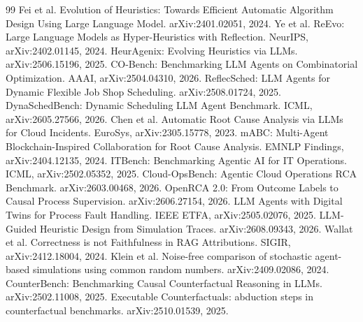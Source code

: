 \documentclass[UTF8,12pt,a4paper]{ctexart}
\begin{document}
\begin{thebibliography}{99}\small
{} Fei et al. Evolution of Heuristics: Towards Efficient Automatic Algorithm Design Using Large Language Model. arXiv:2401.02051, 2024.
 Ye et al. ReEvo: Large Language Models as Hyper-Heuristics with Reflection. NeurIPS, arXiv:2402.01145, 2024.
 HeurAgenix: Evolving Heuristics via LLMs. arXiv:2506.15196, 2025.
 CO-Bench: Benchmarking LLM Agents on Combinatorial Optimization. AAAI, arXiv:2504.04310, 2026.
 ReflecSched: LLM Agents for Dynamic Flexible Job Shop Scheduling. arXiv:2508.01724, 2025.
 DynaSchedBench: Dynamic Scheduling LLM Agent Benchmark. ICML, arXiv:2605.27566, 2026.
 Chen et al. Automatic Root Cause Analysis via LLMs for Cloud Incidents. EuroSys, arXiv:2305.15778, 2023.
 mABC: Multi-Agent Blockchain-Inspired Collaboration for Root Cause Analysis. EMNLP Findings, arXiv:2404.12135, 2024.
 ITBench: Benchmarking Agentic AI for IT Operations. ICML, arXiv:2502.05352, 2025.
 Cloud-OpsBench: Agentic Cloud Operations RCA Benchmark. arXiv:2603.00468, 2026.
 OpenRCA 2.0: From Outcome Labels to Causal Process Supervision. arXiv:2606.27154, 2026.
 LLM Agents with Digital Twins for Process Fault Handling. IEEE ETFA, arXiv:2505.02076, 2025.
 LLM-Guided Heuristic Design from Simulation Traces. arXiv:2608.09343, 2026.
 Wallat et al. Correctness is not Faithfulness in RAG Attributions. SIGIR, arXiv:2412.18004, 2024.
 Klein et al. Noise-free comparison of stochastic agent-based simulations using common random numbers. arXiv:2409.02086, 2024.
 CounterBench: Benchmarking Causal Counterfactual Reasoning in LLMs. arXiv:2502.11008, 2025.
 Executable Counterfactuals: abduction steps in counterfactual benchmarks. arXiv:2510.01539, 2025.
\end{thebibliography}
\end{document}

